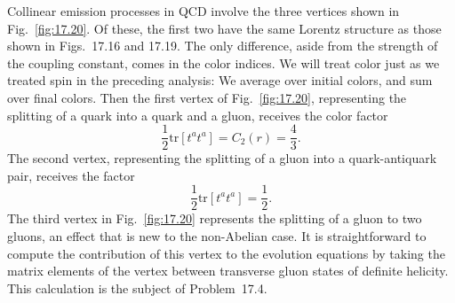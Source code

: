 Collinear emission processes in QCD involve the three vertices shown in
Fig.~\ref{fig:17.20}.  Of these, the first two have the same Lorentz structure
as those shown in Figs.~17.16 and 17.19.  The only
difference, aside from the strength of the coupling constant, comes in the
color indices.  We will treat color just as we treated spin in the preceding
analysis: We average over initial colors, and sum over final colors.  Then
the first vertex of Fig.~\ref{fig:17.20}, representing the splitting of a
quark into a quark and a gluon, receives the color factor
\begin{equation}
  \frac{1}{2}\mathrm{tr}[t^at^a] = C_2(r) = \frac{4}{3} .
  \label{eq:17.126}
\end{equation}
The second vertex, representing the splitting of a gluon into a
quark-antiquark pair, receives the factor
\begin{equation}
  \frac{1}{2}\mathrm{tr}[t^at^a] = \frac{1}{2} .
  \label{eq:17.127}
\end{equation}
The third vertex in Fig.~\ref{fig:17.20} represents the splitting of a gluon
to two gluons, an effect that is new to the non-Abelian case.  It is
straightforward to compute the contribution of this vertex to the evolution
equations by taking the matrix elements of the vertex between transverse
gluon states of definite helicity.  This calculation is the subject of
Problem~17.4.

